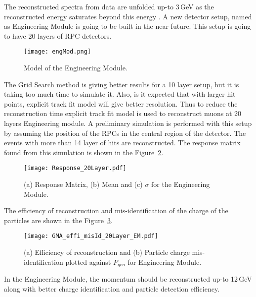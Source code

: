 The reconstructed spectra from data are unfolded up-to 3\,GeV as the
reconstructed energy saturates beyond this energy \cite{daeratio,ratio1}. %
A new detector setup, named as Engineering Module is going to be
built in the near future. This setup is going to have 20 layers of RPC
detectors.
\begin{figure}[h]
  \centering
  \texttt{[image: engMod.png]}
  \caption{Model of the Engineering Module.}
  \label{fig:eng_mod}
\end{figure}
The Grid Search method is giving better results for a 10 layer setup, but it is taking too
much time to simulate it. Also, is it expected that with larger hit points, explicit
track fit model will give better resolution. Thus to reduce the reconstruction time
explicit track fit model is used to reconstruct muons at 20 layers Engineering module.
A preliminary simulation is performed with this setup by assuming the
position of the RPCs in the central region of the detector. The events
with more than 14 layer of hits are reconstructed.
The response matrix found from this simulation is shown in the
Figure~\ref{fig:eng_mod}.
\begin{figure}[h]
  \centering
  \texttt{[image: Response\_20Layer.pdf]}
  \caption{(a) Response Matrix, (b) Mean and (c) $\sigma$ for
    the Engineering Module.}
  \label{fig:eng_mod}
\end{figure}
The efficiency of reconstruction and mis-identification of the charge
of the particles are shown in the Figure~\ref{fig:eng_mod_effi}.
\begin{figure}[h]
  \centering
  \texttt{[image: GMA\_effi\_misId\_20Layer\_EM.pdf]}
  \caption{(a) Efficiency of reconstruction and (b) Particle charge
    mis-identification plotted against $P_{gen}$ for Engineering Module.}
  \label{fig:eng_mod_effi}
\end{figure}
In the Engineering Module, the momentum should be reconstructed
up-to 12\,GeV along with better charge identification and particle
detection efficiency.

